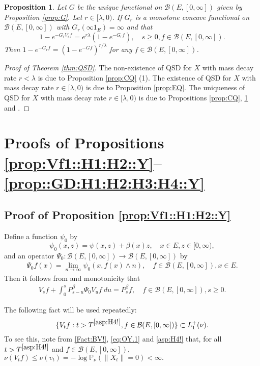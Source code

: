 \documentclass[12pt,a4paper]{amsart}
\numberwithin{equation}{section}
\theoremstyle{plain}
\newtheorem{prop}[thm]{Proposition}
\theoremstyle{definition}
\theoremstyle{remark}
\begin{document}
\begin{prop} \label{prop:UC}
	Let $G$ be the unique functional on $\mathcal B(E,[0,\infty])$ given by Proposition \ref{prop:G}.
	Let $r \in [\lambda, 0)$.
	If $G_r$ is a monotone concave functional on $\mathcal B(E,[0,\infty])$ with $G_r(\infty 1_E) = \infty$ and that
\[
	1 - e^{-G_r V_s f} = e^{r\lambda }(1- e^{- G_r f}), \quad s\geq 0, f\in \mathcal B(E,[0,\infty]).
\]
	Then $1 - e^{-G_rf} = (1 - e^{- G f})^{r/\lambda}$ for any $f\in \mathcal B(E,[0,\infty])$.
\end{prop}

\begin{proof}[Proof of Theorem \ref{thm:QSD}]
	The non-existence of QSD for $X$ with mass decay rate $r < \lambda$ is due to Proposition \ref{prop:CQ} (1).
	The existence of QSD for $X$ with mass decay rate $r \in [\lambda,0)$ is due to Proposition \ref{prop:EQ}.
	The uniqueness of QSD for $X$ with mass decay rate $r\in [\lambda , 0)$ is due to Propositions \ref{prop:CQ}, \ref{prop:UC} and \cite[Theorem 1.17]{Li2011MeasureValued}.
\end{proof}

\section{Proofs of Propositions \ref{prop:Vf1::H1:H2::Y}--\ref{prop::GD:H1:H2:H3:H4::Y}}
\subsection{Proof of Proposition \ref{prop:Vf1::H1:H2::Y}} \label{sec:Vf1}
	Define a function $\psi_0$ by
\[
	\psi_0(x,z) = \psi(x,z)+ \beta(x) z, \quad x\in E, z\in [0,\infty),
\]	
	and an operator $\Psi_0: \mathcal B(E, [0,\infty]) \to \mathcal B(E,[0,\infty])$ by
\begin{align}
	\Psi_0 f(x)
	= \lim_{n\to \infty} \psi_0(x,f(x) \wedge n),
	\quad f\in \mathcal B(E,[0,\infty]), x\in E.
\end{align}
	Then it follows from \cite[Theorem 2.23]{Li2011MeasureValued} and monotonicity that
\begin{align}\label{eq:Vf1.1}
	V_s f + \int_0^s P_{s-u}^\beta \Psi_0 V_{u} f ~du
	= P_s^\beta f,
	\quad f\in \mathcal B(E,[0,\infty]), s\geq 0.
\end{align}

	The following fact will be used repeatedly:
\begin{equation} \label{lem:nV::H2::Vf1}
	\{V_tf:t> T^{\eqref{asp:H4!}}, f\in \mathcal B(E, [0,\infty])\}\subset L_1^+(\nu).
\end{equation}
	To see this, note from \eqref{Fact:BV!}, \eqref{eq:OY.1} and \eqref{asp:H4!} that, for  all $t> T^{\eqref{asp:H4!}}$ and $f\in \mathcal B(E,[0,\infty])$, $\nu(V_t f) \leq \nu(v_t)   = - \log \mathbb P_\nu (\|X_t\| = 0)  < \infty. $
\end{document}
